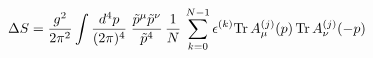\begin{equation}
\Delta S = {g^2 \over 2 \pi^2} \int {d^4 p \over (2 \pi)^4}
\; {{\tilde p}^\mu {\tilde p}^\nu \over
{\tilde p}^4 } \, \frac 1N \, \sum_{k=0}^{N-1} \epsilon^{(k)} 
{\rm Tr}\, A_\mu^{(j)}(p)\, {\rm Tr}\, A_\nu^{(j)}(-p)
\label{action2}
\end{equation}

